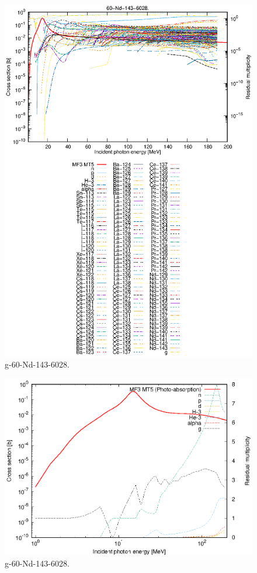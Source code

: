 \begin{figure}
 \includegraphics[width=\linewidth]{eps/g_60-Nd-143_6028.eps}
  \caption{g-60-Nd-143-6028.}
\end{figure}
\newpage \clearpage

\begin{figure}
 \includegraphics[width=\linewidth]{eps-log/g_60-Nd-143_6028.eps}
 \caption{g-60-Nd-143-6028.}
\end{figure}
\newpage \clearpage

